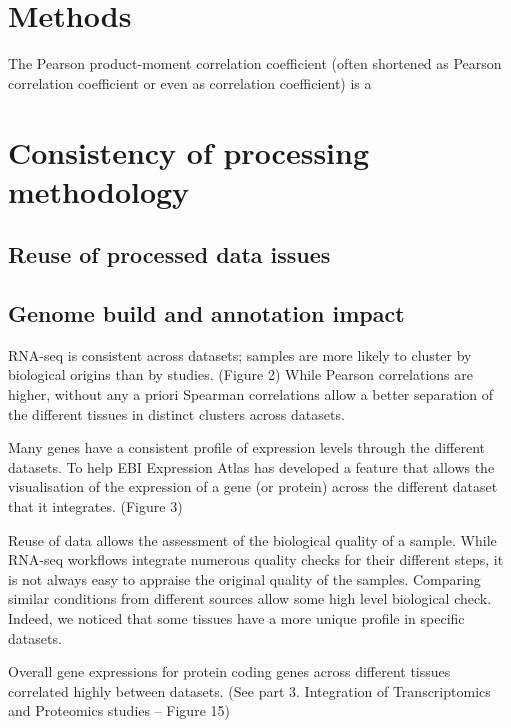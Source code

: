\section{Methods}

The Pearson product-moment correlation coefficient (often shortened as
Pearson correlation coefficient or even as correlation coefficient) is a





\section{Consistency of processing methodology}\label{sec:Trans_consistentMethodo}

    \subsection{Reuse of processed data issues}\label{subsec:Trans_reuseOfData}

    \subsection{Genome build and annotation impact}\label{subsec:Trans_AnnotImpact}

RNA-seq is consistent across datasets; samples are more likely to cluster by
biological origins than by studies. (Figure 2)
While Pearson correlations are higher, without any a priori Spearman correlations
allow a better separation of the different tissues in distinct clusters across
datasets.

Many genes have a consistent profile of expression levels through the different
datasets.
To help EBI Expression Atlas has developed a feature that allows the visualisation
of the expression of a gene (or protein) across the different dataset that it
integrates. (Figure 3)

Reuse of data allows the assessment of the biological quality of a sample.
While RNA-seq workflows integrate numerous quality checks for their different steps,
it is not always easy to appraise the original quality of the samples. Comparing
similar conditions from different sources allow some high level biological check.
Indeed, we noticed that some tissues have a more unique profile in specific
datasets.

Overall gene expressions for protein coding genes across different tissues
correlated highly between datasets. (See part 3. Integration of Transcriptomics
and Proteomics studies – Figure 15)



